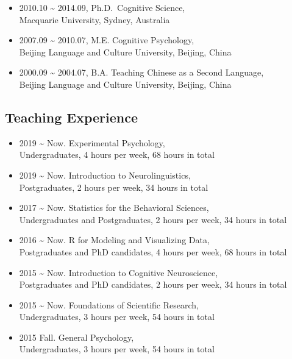 \documentclass[
  12pt,
]{article}
\begin{document}
\begin{itemize}
\item
  2010.10 \textasciitilde{} 2014.09, Ph.D.~Cognitive Science, \\
  Macquarie University, Sydney, Australia
\item
  2007.09 \textasciitilde{} 2010.07, M.E. Cognitive Psychology, \\
  Beijing Language and Culture University, Beijing, China
\item
  2000.09 \textasciitilde{} 2004.07, B.A. Teaching Chinese as a Second
  Language, \\
  Beijing Language and Culture University, Beijing, China
\end{itemize}

\hypertarget{teaching-experience}{%
\subsection{Teaching Experience}\label{teaching-experience}}

\begin{itemize}
\item
  2019 \textasciitilde{} Now. Experimental Psychology, \\
  Undergraduates, 4 hours per week, 68 hours in total
\item
  2019 \textasciitilde{} Now. Introduction to Neurolinguistics, \\
  Postgraduates, 2 hours per week, 34 hours in total
\item
  2017 \textasciitilde{} Now. Statistics for the Behavioral Sciences, \\
  Undergraduates and Postgraduates, 2 hours per week, 34 hours in total
\item
  2016 \textasciitilde{} Now. R for Modeling and Visualizing Data, \\
  Postgraduates and PhD candidates, 4 hours per week, 68 hours in total
\item
  2015 \textasciitilde{} Now. Introduction to Cognitive Neuroscience, \\
  Postgraduates and PhD candidates, 2 hours per week, 34 hours in total
\item
  2015 \textasciitilde{} Now. Foundations of Scientific Research, \\
  Undergraduates, 3 hours per week, 54 hours in total
\item
  2015 Fall. General Psychology, \\
  Undergraduates, 3 hours per week, 54 hours in total
\end{itemize}
\end{document}

